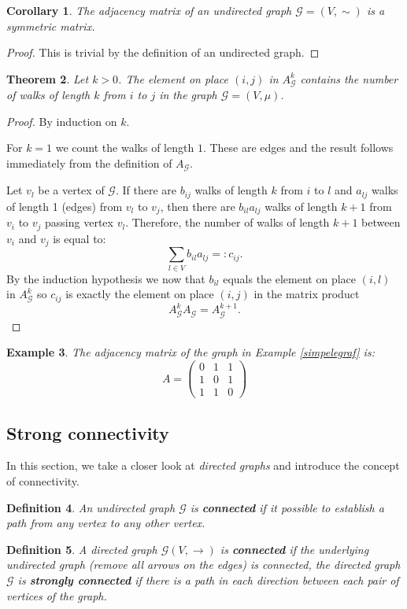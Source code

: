 \documentclass[a4paper,11pt]{report}
\newtheorem{theorem}{Theorem}[section]
\newtheorem{example}[theorem]{Example}
\newtheorem{definition}[theorem]{Definition}
\newtheorem{corollary}[theorem]{Corollary}
\newcommand{\graf}{\mathscr{G}}
\begin{document}
 \begin{corollary}
   The adjacency matrix of an undirected graph $\graf=(V, \sim)$ is a symmetric 
   matrix.
 \end{corollary}
 
 \begin{proof}
   This is trivial by the definition of an undirected graph.
 \end{proof}
\begin{theorem}\label{numberwalks}
  Let $k > 0$. The element on place $(i,j)$ in $A^k_\graf$ contains the number 
  of walks of length $k$ from $i$ to $j$ in the graph $\graf = (V, \mu)$.
\end{theorem}
 \begin{proof}
   By induction on $k$. 
   
   For $k = 1$ we count the walks of length $1$. These are edges and the 
   result follows immediately from the definition of $A_\graf$.
   
  Let $v_l$ be a vertex of $\graf$. If there are $b_{ij}$ walks of length $k$ 
  from $i$ to $l$ and $a_{lj}$ walks of length 1 (edges) from $v_l$ to $v_j$, 
  then there are $b_{il}a_{lj}$ walks of length $k+1$ from $v_i$ to $v_j$ passing vertex 
  $v_l$. Therefore, the number of walks of length $k+1$ between $v_i$ and $v_j$ 
  is equal to:
  $$\sum_{l\in V} b_{il}a_{lj} =: c_{ij}.$$
By the induction hypothesis we now that $b_{il}$ equals  the element on place $(i,l)$ 
in $A^k_\graf$ so $c_{ij}$ is exactly the element on place $(i,j)$ in the matrix 
product
$$A^k_\graf A_\graf = A^{k+1}_\graf.$$
 \end{proof}
 \begin{example}
The adjacency matrix of the graph in Example \ref{simpelegraf} is:
$$A = \begin{pmatrix}
0 & 1 & 1\\
1 & 0 & 1\\
1 & 1 & 0
\end{pmatrix}$$


\end{example}


\subsection{Strong connectivity}
In this section, we take a closer look at \emph{directed graphs} and introduce 
the concept of connectivity.
\begin{definition}
  An undirected graph $\graf$ is \textbf{connected} if it possible to establish a path from any 
   vertex to any other vertex.
    \end{definition}
\begin{definition}
  A directed graph $\graf(V, \to)$ is \textbf{connected} if the underlying undirected graph
  (remove all arrows on the edges) is connected, the directed graph $\graf$ is \textbf{strongly connected} if 
  there is a path in each direction between each pair of vertices of the graph.
    \end{definition}
\end{document}

